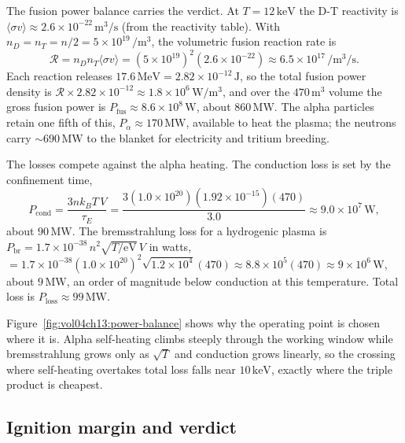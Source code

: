 The fusion power balance carries the verdict. At $T = 12\,\si{\kilo
\electronvolt}$ the D-T reactivity is $\langle\sigma v\rangle \approx
2.6\times 10^{-22}\,\si{\meter\cubed\per\second}$ (from the reactivity
table). With $n_D = n_T = n/2 = 5\times 10^{19}\,\si{\per\meter\cubed}$, the
volumetric fusion reaction rate is
\[
\mathcal{R} = n_D n_T \langle\sigma v\rangle
= (5\times 10^{19})^{2}(2.6\times 10^{-22})
\approx 6.5\times 10^{17}\,\si{\per\meter\cubed\per\second}.
\]
Each reaction releases $17.6\,\si{\mega\electronvolt} = 2.82\times 10^{-12}
\,\si{\joule}$, so the total fusion power density is $\mathcal{R}\times
2.82\times 10^{-12} \approx 1.8\times 10^{6}\,\si{\watt\per\meter\cubed}$,
and over the $470\,\si{\meter\cubed}$ volume the gross fusion power is
$P_{\mathrm{fus}} \approx 8.6\times 10^{8}\,\si{\watt}$, about
$860\,\si{\mega\watt}$. The alpha particles retain one fifth of this,
$P_\alpha \approx 170\,\si{\mega\watt}$, available to heat the plasma; the
neutrons carry $\sim 690\,\si{\mega\watt}$ to the blanket for electricity
and tritium breeding.

The losses compete against the alpha heating. The conduction loss is set by
the confinement time,
\[
P_{\mathrm{cond}} = \frac{3nk_{B}T\,V}{\tau_E}
= \frac{3(1.0\times 10^{20})(1.92\times 10^{-15})(470)}{3.0}
\approx 9.0\times 10^{7}\,\si{\watt},
\]
about $90\,\si{\mega\watt}$. The bremsstrahlung loss for a hydrogenic plasma
is $P_{\mathrm{br}} = 1.7\times 10^{-38}\,n^{2}\sqrt{T/\text{eV}}\,V$ in
watts, $= 1.7\times 10^{-38}(1.0\times 10^{20})^{2}\sqrt{1.2\times 10^{4}}
(470) \approx 8.8\times 10^{5}(470) \approx 9\times 10^{6}\,\si{\watt}$,
about $9\,\si{\mega\watt}$, an order of magnitude below conduction at this
temperature. Total loss is $P_{\mathrm{loss}} \approx 99\,\si{\mega\watt}$.



Figure~\ref{fig:vol04ch13:power-balance} shows why the operating point is
chosen where it is. Alpha self-heating climbs steeply through the working
window while bremsstrahlung grows only as $\sqrt{T}$ and conduction grows
linearly, so the crossing where self-heating overtakes total loss falls
near $10\,\si{\kilo\electronvolt}$, exactly where the triple product is
cheapest.

\subsection{Ignition margin and verdict}

